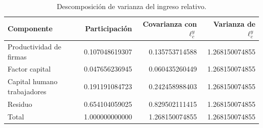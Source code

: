 \begin{table}[H]
    \centering
    \begin{tabular}{lrrr}
        \toprule
        Componente & Participaci\'on & Covarianza con $\ell^y_c$ & Varianza de $\ell^y_c$ \\
        \midrule
        Productividad de firmas & 0.107048619307 & 0.135753714588 & 1.268150074855 \\
        Factor capital & 0.047656236945 & 0.060435260449 & 1.268150074855 \\
        Capital humano trabajadores & 0.191191084723 & 0.242458988403 & 1.268150074855 \\
        Residuo & 0.654104059025 & 0.829502111415 & 1.268150074855 \\
        Total & 1.000000000000 & 1.268150074855 & 1.268150074855 \\
        \bottomrule
    \end{tabular}

    \caption{Descomposici\'on de varianza del ingreso relativo.}
    \label{tab:p6_p4_var_decomp}
\end{table}

